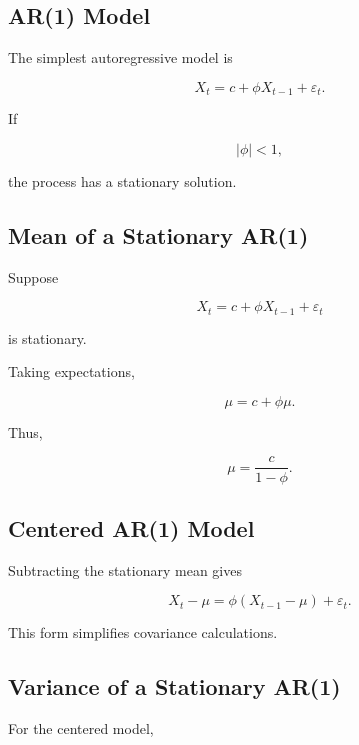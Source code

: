\subsection{AR(1) Model}
\label{subsec:ar1-model}

The simplest autoregressive model is

\[
\boxed{
X_t
=
c
+
\phi X_{t-1}
+
\varepsilon_t.
}
\]

If

\[
|\phi|<1,
\]

the process has a stationary solution.

\subsection{Mean of a Stationary AR(1)}
\label{subsec:ar1-mean}

Suppose

\[
X_t
=
c+\phi X_{t-1}+\varepsilon_t
\]

is stationary.

Taking expectations,

\[
\mu
=
c+\phi\mu.
\]

Thus,

\[
\boxed{
\mu
=
\frac{
c
}{
1-\phi
}.
}
\]

\subsection{Centered AR(1) Model}
\label{subsec:centered-ar1}

Subtracting the stationary mean gives

\[
\boxed{
X_t-\mu
=
\phi
(
X_{t-1}-\mu
)
+
\varepsilon_t.
}
\]

This form simplifies covariance calculations.

\subsection{Variance of a Stationary AR(1)}
\label{subsec:ar1-variance}

For the centered model,

